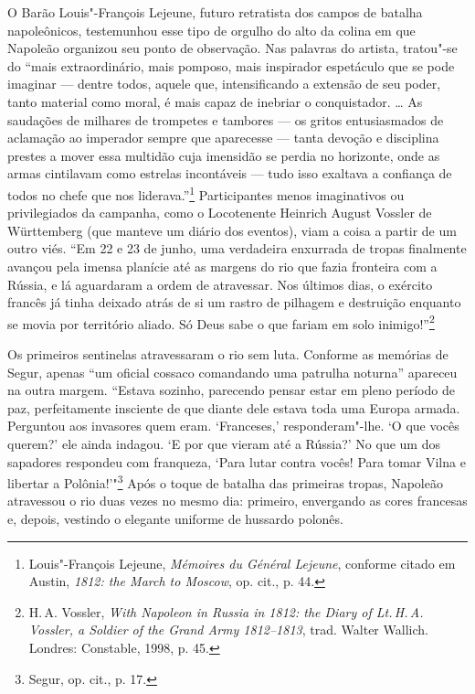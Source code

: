 %

O Barão Louis"-François Lejeune, futuro retratista dos campos de batalha
napoleônicos, testemunhou esse tipo de orgulho do alto da colina em que
Napoleão organizou seu ponto de observação. Nas palavras do artista,
tratou"-se do ``mais extraordinário, mais pomposo, mais inspirador
espetáculo que se pode imaginar --- dentre todos, aquele que,
intensificando a extensão de seu poder, tanto material como moral, é
mais capaz de inebriar o conquistador. \ldots{} As saudações de milhares
de trompetes e tambores --- os gritos entusiasmados de aclamação ao
imperador sempre que aparecesse --- tanta devoção e disciplina prestes a
mover essa multidão cuja imensidão se perdia no horizonte, onde as armas
cintilavam como estrelas incontáveis --- tudo isso exaltava a confiança de
todos no chefe que nos liderava.''\footnote{Louis"-François Lejeune, \textit{Mémoires du Général Lejeune}, conforme citado em Austin, \textit{1812: the March to Moscow}, op. cit., p. 44.} Participantes menos imaginativos ou privilegiados da campanha, como o Locotenente
Heinrich August Vossler de Württemberg (que manteve um diário dos
eventos), viam a coisa a partir de um outro viés. ``Em 22 e 23 de junho,
uma verdadeira enxurrada de tropas finalmente avançou pela imensa
planície até as margens do rio que fazia fronteira com a Rússia, e lá
aguardaram a ordem de atravessar. Nos últimos dias, o exército francês
já tinha deixado atrás de si um rastro de pilhagem e destruição enquanto
se movia por território aliado. Só Deus sabe o que fariam em solo
inimigo!''\footnote{H.\,A. Vossler, \textit{With Napoleon in Russia in 1812: the Diary of Lt.\,H.\,A. Vossler, a Soldier of the Grand Army 1812--1813}, trad. Walter Wallich. Londres: Constable, 1998, p. 45.}

Os primeiros sentinelas atravessaram o rio sem luta. Conforme as
memórias de Segur, apenas ``um oficial cossaco comandando uma patrulha
noturna'' apareceu na outra margem. ``Estava sozinho, parecendo pensar
estar em pleno período de paz, perfeitamente insciente de que diante
dele estava toda uma Europa armada. Perguntou aos invasores quem eram.
`Franceses,' responderam"-lhe. `O que vocês querem?' ele ainda indagou.
`E por que vieram até a Rússia?' No que um dos sapadores respondeu com
franqueza, `Para lutar contra vocês! Para tomar Vilna e libertar a
Polônia!'"\footnote{Segur, op. cit., p. 17.} Após o toque de batalha
das primeiras tropas, Napoleão atravessou o rio duas vezes no mesmo dia:
primeiro, envergando as cores francesas e, depois, vestindo o elegante
uniforme de hussardo polonês.

